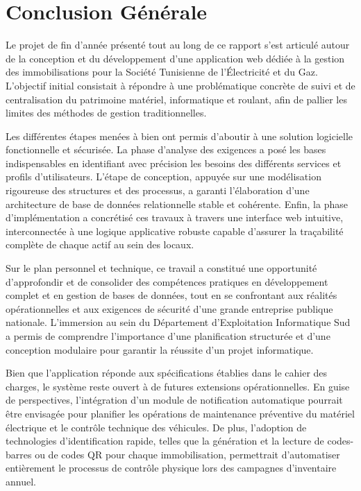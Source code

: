 \chapter*{Conclusion Générale}

Le projet de fin d'année présenté tout au long de ce rapport s'est articulé autour de la conception et du développement d'une application web dédiée à la gestion des immobilisations pour la Société Tunisienne de l'Électricité et du Gaz. L'objectif initial consistait à répondre à une problématique concrète de suivi et de centralisation du patrimoine matériel, informatique et roulant, afin de pallier les limites des méthodes de gestion traditionnelles.

Les différentes étapes menées à bien ont permis d'aboutir à une solution logicielle fonctionnelle et sécurisée. La phase d'analyse des exigences a posé les bases indispensables en identifiant avec précision les besoins des différents services et profils d'utilisateurs. L'étape de conception, appuyée sur une modélisation rigoureuse des structures et des processus, a garanti l'élaboration d'une architecture de base de données relationnelle stable et cohérente. Enfin, la phase d'implémentation a concrétisé ces travaux à travers une interface web intuitive, interconnectée à une logique applicative robuste capable d'assurer la traçabilité complète de chaque actif au sein des locaux.

Sur le plan personnel et technique, ce travail a constitué une opportunité d'approfondir et de consolider des compétences pratiques en développement complet et en gestion de bases de données, tout en se confrontant aux réalités opérationnelles et aux exigences de sécurité d'une grande entreprise publique nationale. L'immersion au sein du Département d'Exploitation Informatique Sud a permis de comprendre l'importance d'une planification structurée et d'une conception modulaire pour garantir la réussite d'un projet informatique.

Bien que l'application réponde aux spécifications établies dans le cahier des charges, le système reste ouvert à de futures extensions opérationnelles. En guise de perspectives, l'intégration d'un module de notification automatique pourrait être envisagée pour planifier les opérations de maintenance préventive du matériel électrique et le contrôle technique des véhicules. De plus, l'adoption de technologies d'identification rapide, telles que la génération et la lecture de codes-barres ou de codes QR pour chaque immobilisation, permettrait d'automatiser entièrement le processus de contrôle physique lors des campagnes d'inventaire annuel.